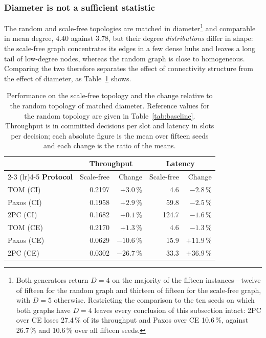 \documentclass[journal]{IEEEtran}
\newcommand{\CI}{CI}                      %
\newcommand{\CE}{CE}                      %
\newcommand{\Diam}{D}                     %
\begin{document}
\subsubsection{Diameter is not a sufficient statistic}

The random and scale-free topologies are matched in
diameter\footnote{Both generators return $\Diam = 4$ on the majority of the
fifteen instances---twelve of fifteen for the random graph and thirteen of
fifteen for the scale-free graph, with $\Diam = 5$ otherwise. Restricting the
comparison to the ten seeds on which both graphs have $\Diam = 4$ leaves every
conclusion of this subsection intact: 2PC over \CE{} loses 27.4\,\% of its
throughput and Paxos over \CE{} 10.6\,\%, against 26.7\,\% and 10.6\,\% over
all fifteen seeds.} and comparable in mean degree, 4.40 against 3.78, but
their degree \emph{distributions} differ in shape: the scale-free graph
concentrates its edges in a few dense hubs and leaves a long tail of
low-degree nodes, whereas the random graph is close to homogeneous. Comparing
the two therefore separates the effect of connectivity structure from the
effect of diameter, as Table~\ref{tab:degree} shows.

\begin{table}[!t]
\caption{Performance on the scale-free topology and the change relative to
the random topology of matched diameter. Reference values for the random
topology are given in Table~\ref{tab:baseline}. Throughput is in committed
decisions per slot and latency in slots per decision; each absolute figure is
the mean over fifteen seeds and each change is the ratio of the means.}
\label{tab:degree}
\centering
\footnotesize
\setlength{\tabcolsep}{4pt}
\begin{tabular}{@{}lrrrr@{}}
\toprule
 & \multicolumn{2}{c}{\textbf{Throughput}} &
   \multicolumn{2}{c}{\textbf{Latency}} \\
\cmidrule(lr){2-3} \cmidrule(lr){4-5}
\textbf{Protocol} & Scale-free & Change & Scale-free & Change \\
\midrule
TOM (\CI)   & 0.2197 & $+3.0$\,\%  & 4.6   & $-2.8$\,\%  \\
Paxos (\CI) & 0.1958 & $+2.9$\,\%  & 59.8  & $-2.5$\,\%  \\
2PC (\CI)   & 0.1682 & $+0.1$\,\%  & 124.7 & $-1.6$\,\%  \\
TOM (\CE)   & 0.2170 & $+1.3$\,\%  & 4.6   & $-1.3$\,\%  \\
\addlinespace
Paxos (\CE) & 0.0629 & $-10.6$\,\% & 15.9  & $+11.9$\,\% \\
2PC (\CE)   & 0.0302 & $-26.7$\,\% & 33.3  & $+36.9$\,\% \\
\bottomrule
\end{tabular}
\end{table}
\end{document}
